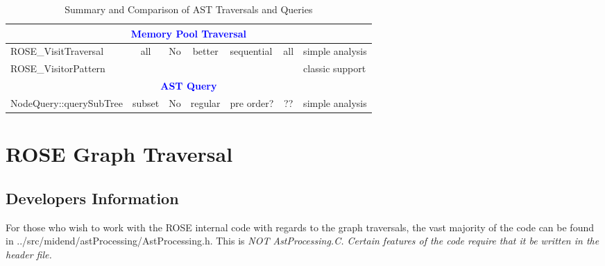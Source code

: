 \begin{table}[htbp]
{\begin{tabular}{||l|c|p{1.0in}|c|p{0.8in}|c|p{1.0in}||}
 \multicolumn{7}{||c||}{\textbf{\textcolor{blue}{Memory Pool Traversal}}} \\\hline \hline
ROSE\_VisitTraversal & all & No  & better  & sequential & all & simple
analysis  \\
\cline{1-1} \cline{7-7}
ROSE\_VisitorPattern &  & & &  & & classic support \\ \hline

 \multicolumn{7}{||c||}{\textbf{\textcolor{blue}{AST Query}}} \\\hline \hline
  NodeQuery::querySubTree& subset & No & regular & pre order? & ?? &
  simple analysis \\ \hline


\end{tabular}
}
\caption{Summary and Comparison of AST Traversals and Queries}
\label{tab:sumTraversal}
\end{table}


\section{ROSE Graph Traversal}

\subsection{Developers Information}
\label{Developers_Information}
For those who wish to work with the ROSE internal code with regards to the graph traversals,
the vast majority of the code can be found in ../src/midend/astProcessing/AstProcessing.h.
This is \em{NOT} AstProcessing.C. Certain features of the code require that it be written in the
header file.
